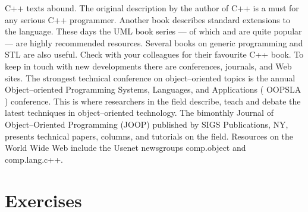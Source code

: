 C++ texts abound. The original description by the author of C++ \cite{Stroustrup84} is a must for any serious C++ programmer. Another book \cite{Ellis90} describes standard extensions to the language.
These days the UML book series --- of which \cite{Booch98} and \cite{Rumbaugh98} are quite popular --- are highly recommended resources. Several books on generic programming \cite{Austern99} and STL \cite{Musser96} are also useful. Check with your colleagues for their favourite C++ book.
To keep in touch with new developments there are conferences, journals, and Web sites. The strongest technical conference on object--oriented topics is the annual Object--oriented Programming Systems, Languages, and Applications ( OOPSLA ) conference. This is where researchers in the field describe, teach and debate the latest techniques in object--oriented technology. The bimonthly Journal of Object--Oriented Programming (JOOP) published by SIGS Publications, NY, presents technical papers, columns, and tutorials on the field. Resources on the World Wide Web include the Usenet newsgroups comp.object and comp.lang.c++.


\printbibliography

\section{Exercises}


